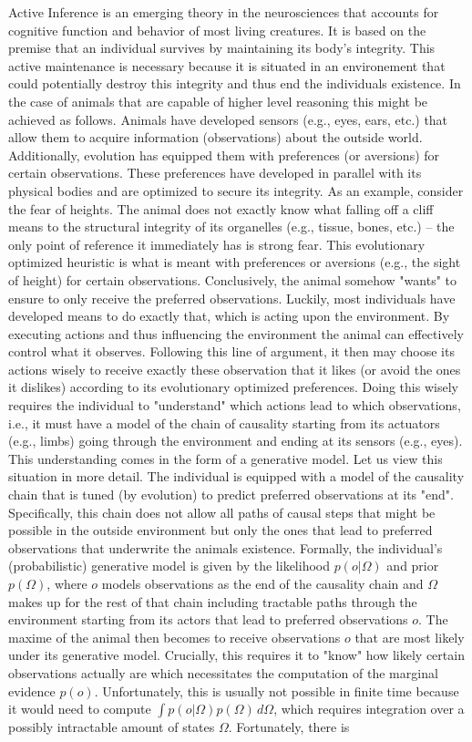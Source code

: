 Active Inference is an emerging theory in the neurosciences that accounts for cognitive function and behavior of most living creatures. It is based on the premise that an individual survives by maintaining its body's integrity. This active maintenance is necessary because it is situated in an environement that could potentially destroy this integrity and thus end the individuals existence. In the case of animals that are capable of higher level reasoning this might be achieved as follows. Animals have developed sensors (e.g., eyes, ears, etc.) that allow them to acquire information (observations) about the outside world. Additionally, evolution has equipped them with preferences (or aversions) for certain observations. These preferences have developed in parallel with its physical bodies and are optimized to secure its integrity. As an example, consider the fear of heights. The animal does not exactly know what falling off a cliff means to the structural integrity of its organelles (e.g., tissue, bones, etc.) – the only point of reference it immediately has is strong fear. This evolutionary optimized heuristic is what is meant with preferences or aversions (e.g., the sight of height) for certain observations. Conclusively, the animal somehow "wants" to ensure to only receive the preferred observations. Luckily, most individuals have developed means to do exactly that, which is acting upon the environment. By executing actions and thus influencing the environment the animal can effectively control what it observes. Following this line of argument, it then may choose its actions wisely to receive exactly these observation that it likes (or avoid the ones it dislikes) according to its evolutionary optimized preferences. Doing this wisely requires the individual to "understand" which actions lead to which observations, i.e., it must have a model of the chain of causality starting from its actuators (e.g., limbs) going through the environment and ending at its sensors (e.g., eyes). This understanding comes in the form of a generative model. Let us view this situation in more detail. The individual is equipped with a model of the causality chain that is tuned (by evolution) to predict preferred observations at its "end". Specifically, this chain does not allow all paths of causal steps that might be possible in the outside environment but only the ones that lead to preferred observations that underwrite the animals existence. Formally, the individual's (probabilistic) generative model is given by the likelihood \(p(o|\Omega)\) and prior \(p(\Omega)\), where \(o\) models observations as the end of the causality chain and \(\Omega\) makes up for the rest of that chain including tractable paths through the environment starting from its actors that lead to preferred observations \(o\). The maxime of the animal then becomes to receive observations \(o\) that are most likely under its generative model. Crucially, this requires it to "know" how likely certain observations actually are which necessitates the computation of the marginal evidence \(p(o)\). Unfortunately, this is usually not possible in finite time because it would need to compute \(\int p(o|\Omega)p(\Omega)\, d\Omega\), which requires integration over a possibly intractable amount of states \(\Omega\). Fortunately, there is 